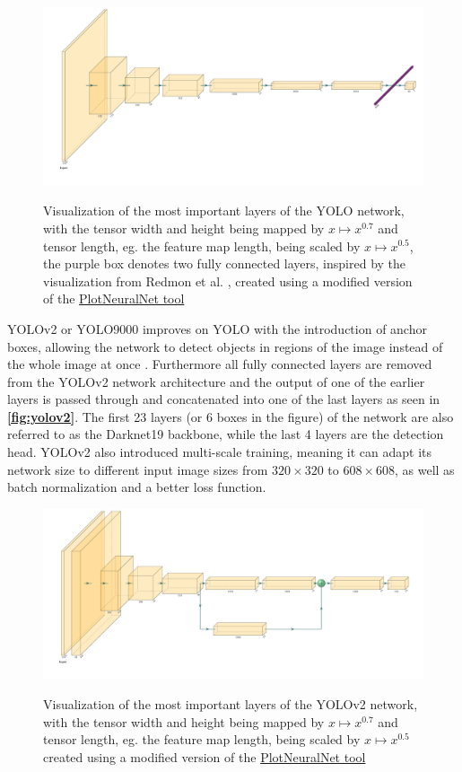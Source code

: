 \documentclass[10pt]{book}
\newcommand{\figureref}[1]{\textbf{\autoref{#1}}}
\begin{document}
\begin{figure}
  \caption{Visualization of the most important layers of the \ac{YOLO} network, with the tensor width and height being mapped by $x \mapsto x^{0.7}$ and tensor length, eg. the feature map length, being scaled by $x \mapsto x^{0.5}$, the purple box denotes two fully connected layers, inspired by the visualization from Redmon et al. \cite{redmon2016you}, created using a modified version of the \href{https://github.com/jnccd/PlotNeuralNet}{PlotNeuralNet tool} \cite{haris_iqbal_2018_2526396}}
  \includegraphics[width=\textwidth]{image/yolo}
  \label{fig:yolo}
\end{figure}

\ac{YOLO}v2 or \ac{YOLO}9000 improves on \ac{YOLO} with the introduction of anchor boxes, allowing the network to detect objects in regions of the image instead of the whole image at once \cite{redmon2017yolo9000}. Furthermore all fully connected layers are removed from the \ac{YOLO}v2 network architecture and the output of one of the earlier layers is passed through and concatenated into one of the last layers as seen in \figureref{fig:yolov2}. The first 23 layers (or 6 boxes in the figure) of the network are also referred to as the Darknet19 backbone, while the last 4 layers are the detection head. \ac{YOLO}v2 also introduced multi-scale training, meaning it can adapt its network size to different input image sizes from $320 \times 320$ to $608 \times 608$, as well as batch normalization and a better loss function.

\begin{figure}
  \caption{Visualization of the most important layers of the \ac{YOLO}v2 network, with the tensor width and height being mapped by $x \mapsto x^{0.7}$ and tensor length, eg. the feature map length, being scaled by $x \mapsto x^{0.5}$ created using a modified version of the \href{https://github.com/jnccd/PlotNeuralNet}{PlotNeuralNet tool} \cite{haris_iqbal_2018_2526396}}
  \includegraphics[width=\textwidth]{image/yolov2}
  \label{fig:yolov2}
\end{figure}
\end{document}
